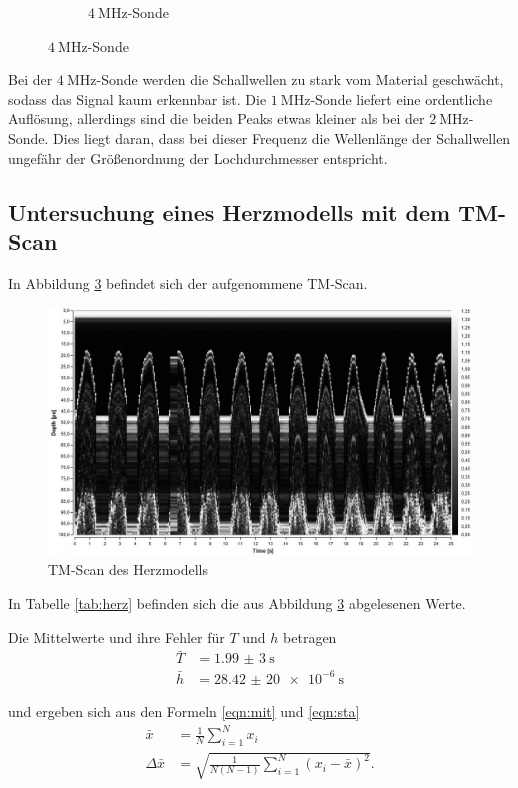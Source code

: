 \begin{figure}[H]
\begin{subfigure}[b]{0.69\textwidth}
                \caption{$\SI{4}{\MHz}$-Sonde}
                \label{fig:grün}
        \end{subfigure}
\end{figure}

Bei der $\SI{4}{\MHz}$-Sonde werden die Schallwellen zu stark vom Material geschwächt, sodass das Signal kaum erkennbar ist.
Die $\SI{1}{\MHz}$-Sonde liefert eine ordentliche Auflösung, allerdings sind die beiden Peaks etwas kleiner als
bei der $\SI{2}{\MHz}$-Sonde. Dies liegt daran, dass bei dieser Frequenz die Wellenlänge der Schallwellen ungefähr der Größenordnung
der Lochdurchmesser entspricht.

\subsection{Untersuchung eines Herzmodells mit dem TM-Scan}

In Abbildung \ref{fig:herz} befindet sich der aufgenommene TM-Scan.
\begin{figure}[H]
  \centering
  \includegraphics[width=\textwidth]{Scan-Bilder/tmscan0.jpg}
  \caption{TM-Scan des Herzmodells}
  \label{fig:herz}
\end{figure}

In Tabelle \ref{tab:herz} befinden sich die aus Abbildung \ref{fig:herz} abgelesenen Werte.


Die Mittelwerte und ihre Fehler für $T$ und $h$ betragen
\begin{align*}
  \bar{T} &= \SI{1,99(3)}{\s} \\
  \bar{h} &= \SI{28,42(20)e-6}{\s}
\end{align*}

und ergeben sich aus den Formeln \eqref{eqn:mit} und \eqref{eqn:sta}
\begin{align}
  \bar{x} &= \frac{1}{N} \sum_{i=1}^{N} x_i \label{eqn:mit} \\
  \Delta \bar{x} &= \sqrt{\frac{1}{N (N - 1)} \sum_{i=1}^{N} (x_i - \bar{x})^2}. \label{eqn:sta}
\end{align}


